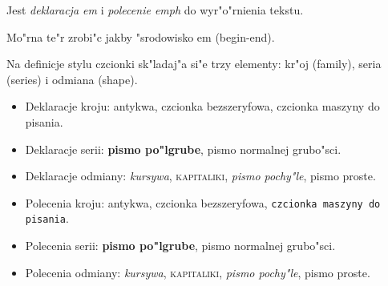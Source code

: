 \documentclass[12pt]{article}
\begin{document}
Jest {\em deklaracja em} i \emph{polecenie emph}
do wyr"o"rnienia tekstu.
\begin{em}
Mo"rna te"r zrobi"c jakby "srodowisko em (begin-end).
\end{em}

Na definicje stylu czcionki sk"ladaj"a si"e trzy elementy:
kr"oj (family), seria (series) i odmiana (shape).

\begin{itemize}
\item Deklaracje kroju:
{\rmfamily antykwa},
{\sffamily czcionka bezszeryfowa},
{\ttfamily czcionka maszyny do pisania}.
\item Deklaracje serii:
{\bfseries pismo po"lgrube},
{\mdseries pismo normalnej grubo"sci}.
\item Deklaracje odmiany:
{\itshape kursywa},
{\scshape kapitaliki},
{\slshape pismo pochy"le},
{\upshape pismo proste}.
\end{itemize}

\begin{itemize}
\item Polecenia kroju:
\textrm{antykwa},
\textsf{czcionka bezszeryfowa},
\texttt{czcionka maszyny do pisania}.
\item Polecenia serii:
\textbf{pismo po"lgrube},
\textmd{pismo normalnej grubo"sci}.
\item Polecenia odmiany:
\textit{kursywa},
\textsc{kapitaliki},
\textsl{pismo pochy"le},
\textup{pismo proste}.
\end{itemize}
\end{document}
